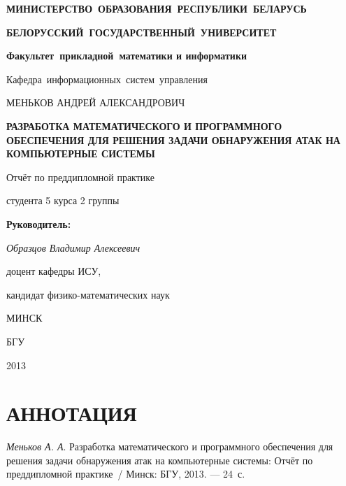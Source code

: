 \titlepage
\begin{center}
	\begin{large}
		\textbf{МИНИСТЕРСТВО~ОБРАЗОВАНИЯ~РЕСПУБЛИКИ~БЕЛАРУСЬ}
		
		\smallskip
		\textbf{БЕЛОРУССКИЙ~ГОСУДАРСТВЕННЫЙ~УНИВЕРСИТЕТ}
		
		\smallskip
		\textbf{Факультет~прикладной~математики и информатики}
		
		\smallskip
		Кафедра~информационных~систем~управления
	\end{large}
\end{center}

\vfill

\begin{center}
	\large {МЕНЬКОВ АНДРЕЙ АЛЕКСАНДРОВИЧ}
	
	\bigskip	
	{\Large \textbf{РАЗРАБОТКА МАТЕМАТИЧЕСКОГО И ПРОГРАММНОГО ОБЕСПЕЧЕНИЯ ДЛЯ РЕШЕНИЯ ЗАДАЧИ ОБНАРУЖЕНИЯ АТАК НА КОМПЬЮТЕРНЫЕ СИСТЕМЫ}}
	
	\bigskip
	Отчёт по преддипломной практике
	
	студента 5 курса 2 группы
\end{center}


\vfill
\begin{flushright}
	\begin{minipage}{7cm}
		\textbf{Руководитель:}
		
		\textit{Образцов Владимир Алексеевич}
		
		доцент кафедры ИСУ,
		
		кандидат физико-математических наук 
	\end{minipage}
\end{flushright}

\vfill

\begin{center}
	МИНСК
	
	БГУ
	
	2013
\end{center}

\newpage

\newcommand{\pagescount}{24}
\section*{АННОТАЦИЯ}

\textit{Меньков А. А}. Разработка математического и программного обеспечения для решения задачи обнаружения атак на компьютерные системы:
Отчёт по преддипломной практике~/ Минск: 
БГУ, 2013. --- \pagescount~с.

